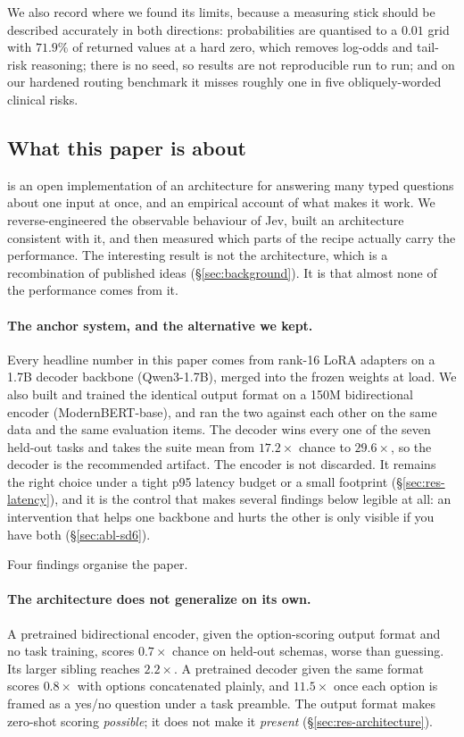We also record where we found its limits, because a measuring stick should
be described accurately in both directions: probabilities are quantised to
a $0.01$ grid with $71.9\%$ of returned values at a hard zero, which
removes log-odds and tail-risk reasoning; there is no seed, so results are
not reproducible run to run; and on our hardened routing benchmark it
misses roughly one in five obliquely-worded clinical risks.

\subsection{What this paper is about}

\openjev{} is an open implementation of an architecture for answering many
typed questions about one input at once, and an empirical account of what
makes it work. We reverse-engineered the observable behaviour of Jev, built
an architecture consistent with it, and then measured which parts of the
recipe actually carry the performance. The interesting result is not the
architecture, which is a recombination of published ideas
(\S\ref{sec:background}). It is that almost none of the performance comes
from it.

\paragraph{The anchor system, and the alternative we kept.} Every headline
number in this paper comes from rank-16 LoRA adapters on a 1.7B decoder
backbone (Qwen3-1.7B), merged into the frozen weights at load. We also
built and trained the identical output format on a 150M bidirectional
encoder (ModernBERT-base), and ran the two against each other on the same
data and the same evaluation items. The decoder wins every one of the
seven held-out tasks and takes the suite mean from $17.2\times$ chance to
$29.6\times$, so the decoder is the recommended artifact. The encoder is
not discarded. It remains the right choice under a tight p95 latency
budget or a small footprint (\S\ref{sec:res-latency}), and it is the
control that makes several findings below legible at all: an intervention
that helps one backbone and hurts the other is only visible if you have
both (\S\ref{sec:abl-sd6}).

Four findings organise the paper.

\paragraph{The architecture does not generalize on its own.} A pretrained
bidirectional encoder, given the option-scoring output format and no task
training, scores $0.7\times$ chance on held-out schemas, worse than
guessing. Its larger sibling reaches $2.2\times$. A pretrained decoder
given the same format scores $0.8\times$ with options concatenated
plainly, and $11.5\times$ once each option is framed as a yes/no question
under a task preamble. The output format makes zero-shot scoring
\emph{possible}; it does not make it \emph{present}
(\S\ref{sec:res-architecture}).

